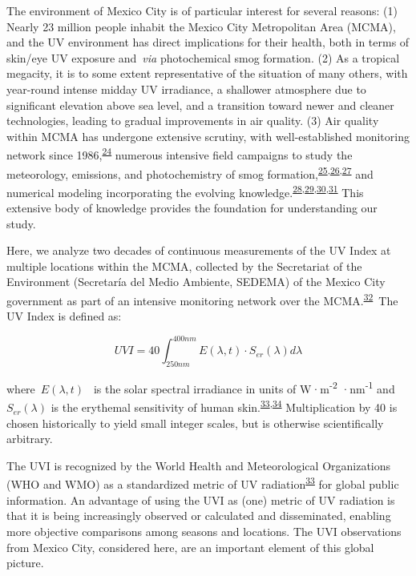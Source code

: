 \documentclass[10pt]{article}
\begin{document}
The environment of Mexico City is of particular interest for several
reasons: (1) Nearly 23 million people inhabit the Mexico City
Metropolitan Area (MCMA), and the UV environment has direct implications
for their health, both in terms of skin/eye UV exposure and~\emph{via}
photochemical smog formation. (2) As a tropical megacity, it is to some
extent representative of the situation of many others, with year-round
intense midday UV irradiance, a shallower atmosphere due to significant
elevation above sea level, and a transition toward newer and cleaner
technologies, leading to gradual improvements in air quality. (3) Air
quality within MCMA has undergone extensive scrutiny, with
well-established monitoring network since 1986,\textsuperscript{\hyperref[csl:24]{24}}
numerous intensive field campaigns to study the meteorology, emissions,
and photochemistry of smog formation,\textsuperscript{\hyperref[csl:25]{25},\hyperref[csl:26]{26},\hyperref[csl:27]{27}} and numerical
modeling incorporating the evolving knowledge.\textsuperscript{\hyperref[csl:28]{28},\hyperref[csl:29]{29},\hyperref[csl:30]{30},\hyperref[csl:31]{31}} This
extensive body of knowledge provides the foundation for understanding
our study.

Here, we analyze two decades of continuous measurements of the UV Index
at multiple locations within the MCMA, collected by the Secretariat of
the Environment (Secretaría del Medio Ambiente, SEDEMA) of the Mexico
City government as part of an intensive monitoring network over the
MCMA.\textsuperscript{\hyperref[csl:32]{32}}~The UV Index is defined as:

\begin{equation}
\label{eq:UVI}
UVI=40 \int_{250nm}^{400nm} E\left(\lambda,t\right) \cdot S_{er}(\lambda) d\lambda
\end{equation}

where~\(E(\lambda,t)\)\emph{~} is the solar spectral irradiance in
units of W·m\textsuperscript{-2} ·nm\textsuperscript{-1}
and~\(S_{er}\left(\lambda\right)\) is the erythemal sensitivity of human
skin.\textsuperscript{\hyperref[csl:33]{33},\hyperref[csl:34]{34}} Multiplication by 40 is chosen historically to
yield small integer scales, but is otherwise scientifically arbitrary.

The UVI is recognized by the World Health and Meteorological
Organizations (WHO and WMO) as a standardized metric of UV
radiation\textsuperscript{\hyperref[csl:33]{33}} for global public information. An advantage
of using the UVI as (one) metric of UV radiation is that it is being
increasingly observed or calculated and disseminated, enabling more
objective comparisons among seasons and locations. The UVI observations
from Mexico City, considered here, are an important element of this
global picture. ~
\end{document}
